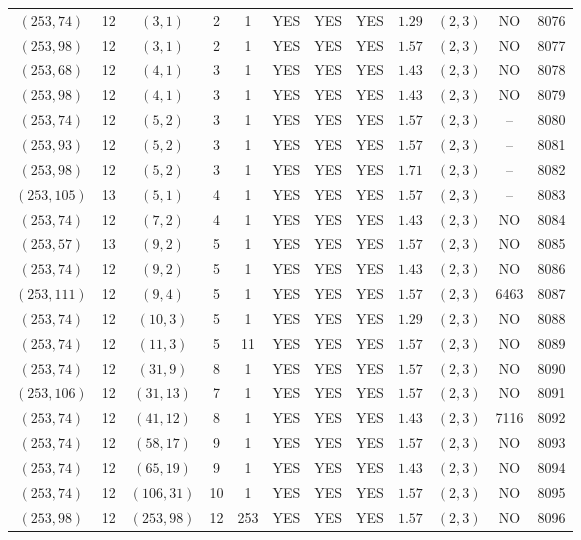 \begin{longtable}{|c|c|c|c|c|c|c|c|c|c|c|c|}
$(253,74)$ & 12 & $(3,1)$ & 2 & 1 & YES & YES & YES & $1.29$ & $(2,3)$ & NO & 8076\\
$(253,98)$ & 12 & $(3,1)$ & 2 & 1 & YES & YES & YES & $1.57$ & $(2,3)$ & NO & 8077\\
$(253,68)$ & 12 & $(4,1)$ & 3 & 1 & YES & YES & YES & $1.43$ & $(2,3)$ & NO & 8078\\
$(253,98)$ & 12 & $(4,1)$ & 3 & 1 & YES & YES & YES & $1.43$ & $(2,3)$ & NO & 8079\\
$(253,74)$ & 12 & $(5,2)$ & 3 & 1 & YES & YES & YES & $1.57$ & $(2,3)$ & -- & 8080\\
$(253,93)$ & 12 & $(5,2)$ & 3 & 1 & YES & YES & YES & $1.57$ & $(2,3)$ & -- & 8081\\
$(253,98)$ & 12 & $(5,2)$ & 3 & 1 & YES & YES & YES & $1.71$ & $(2,3)$ & -- & 8082\\
$(253,105)$ & 13 & $(5,1)$ & 4 & 1 & YES & YES & YES & $1.57$ & $(2,3)$ & -- & 8083\\
$(253,74)$ & 12 & $(7,2)$ & 4 & 1 & YES & YES & YES & $1.43$ & $(2,3)$ & NO & 8084\\
$(253,57)$ & 13 & $(9,2)$ & 5 & 1 & YES & YES & YES & $1.57$ & $(2,3)$ & NO & 8085\\
$(253,74)$ & 12 & $(9,2)$ & 5 & 1 & YES & YES & YES & $1.43$ & $(2,3)$ & NO & 8086\\
$(253,111)$ & 12 & $(9,4)$ & 5 & 1 & YES & YES & YES & $1.57$ & $(2,3)$ & 6463 & 8087\\
$(253,74)$ & 12 & $(10,3)$ & 5 & 1 & YES & YES & YES & $1.29$ & $(2,3)$ & NO & 8088\\
$(253,74)$ & 12 & $(11,3)$ & 5 & 11 & YES & YES & YES & $1.57$ & $(2,3)$ & NO & 8089\\
$(253,74)$ & 12 & $(31,9)$ & 8 & 1 & YES & YES & YES & $1.57$ & $(2,3)$ & NO & 8090\\
$(253,106)$ & 12 & $(31,13)$ & 7 & 1 & YES & YES & YES & $1.57$ & $(2,3)$ & NO & 8091\\
$(253,74)$ & 12 & $(41,12)$ & 8 & 1 & YES & YES & YES & $1.43$ & $(2,3)$ & 7116 & 8092\\
$(253,74)$ & 12 & $(58,17)$ & 9 & 1 & YES & YES & YES & $1.57$ & $(2,3)$ & NO & 8093\\
$(253,74)$ & 12 & $(65,19)$ & 9 & 1 & YES & YES & YES & $1.43$ & $(2,3)$ & NO & 8094\\
$(253,74)$ & 12 & $(106,31)$ & 10 & 1 & YES & YES & YES & $1.57$ & $(2,3)$ & NO & 8095\\
$(253,98)$ & 12 & $(253,98)$ & 12 & 253 & YES & YES & YES & $1.57$ & $(2,3)$ & NO & 8096\\

\end{longtable}
